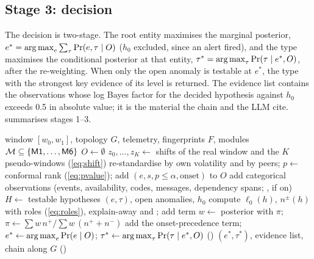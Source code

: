 \subsection{Stage 3: decision}\label{sec:decision}
The decision is two-stage. The root entity maximises the marginal posterior,
$e^\ast=\operatorname*{arg\,max}_{e}\sum_{\tau}\Pr(e,\tau\mid O)$ ($h_0$ excluded, since an alert fired), and the type maximises the conditional
posterior at that entity, $\tau^\ast=\operatorname*{arg\,max}_{\tau}\Pr(\tau\mid e^\ast,O)$, after the  re-weighting. When only the open
anomaly is testable at $e^\ast$, the type with the strongest key evidence of its level is returned. The evidence list contains the
observations whose log Bayes factor for the decided hypothesis against $h_0$ exceeds 0.5 in absolute value; it is the material the
chain and the LLM cite.  summarises stages 1--3.

\begin{algorithm}[!htbp]
\caption{\core{} on one incident (no labels, no training)}\label{alg:gama}
\small
\begin{algorithmic}[1]
\Require window $[w_0,w_1]$, topology $G$, telemetry, fingerprints $F$, modules $\mathcal{M}\subseteq\{\textsf{M1},\dots,\textsf{M6}\}$
\State $O\gets\emptyset$
  \State $z_0,\dots,z_K\gets$ shifts of the real window and the $K$ pseudo-windows (\cref{eq:shift})
  \State re-standardise by own volatility and by peers; $p\gets$ conformal rank (\cref{eq:pvalue}); add $(e,s,p\le\alpha,\text{onset})$ to $O$
\EndFor
\State add categorical observations (events, availability, codes, messages, dependency spans; ,  if on)
\State $H\gets$ testable hypotheses $(e,\tau)$, open anomalies, $h_0$
\State compute $\ell_0(h)$, $n^\pm(h)$ with roles (\cref{eq:roles}), explain-away and ; add  term
\Repeat {}
  \State $w\gets$ posterior with $\pi$; \quad $\pi\gets\sum w\,n^+/\sum w\,(n^++n^-)$
\State add the onset-precedence term; $e^\ast\gets\operatorname*{arg\,max}_e\Pr(e\mid O)$; $\tau^\ast\gets\operatorname*{arg\,max}_\tau\Pr(\tau\mid e^\ast,O)$ ()
\State \Return $(e^\ast,\tau^\ast)$, evidence list, chain along $G$ ()
\end{algorithmic}
\end{algorithm}


